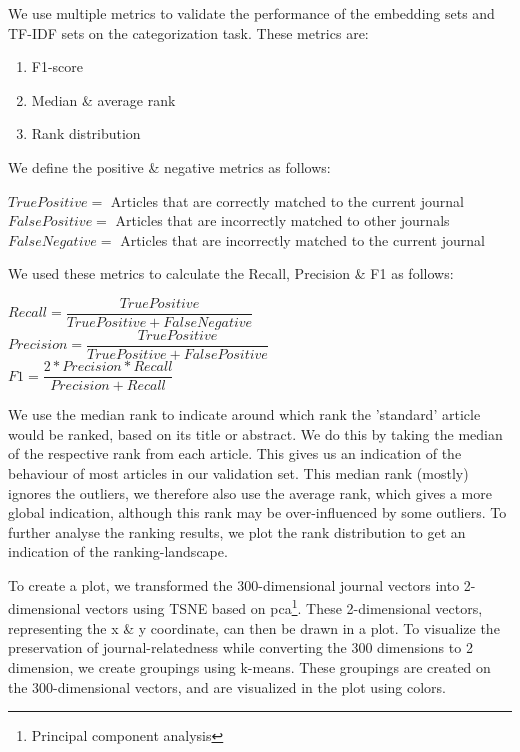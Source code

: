 \documentclass[../../Thesis.tex]{subfiles}
\begin{document}
We use multiple metrics to validate the performance of the embedding sets and TF-IDF sets on the categorization task. These metrics are:
\begin{enumerate}
\item{F1-score}
\item{Median \& average rank}
\item{Rank distribution}
\end{enumerate}
We define the positive \& negative metrics as follows:\\
\begin{jumpin}
$True Positive = $ Articles that are correctly matched to the current journal\\
$False Positive = $ Articles that are incorrectly matched to other journals\\
$False Negative = $ Articles that are incorrectly matched to the current journal\\
\end{jumpin}
We used these metrics to calculate the Recall, Precision \& F1 as follows:\\
\begin{jumpin}
$Recall = \dfrac{True Positive}{True Positive + False Negative}$\vspace{0.1in}\\
$Precision = \dfrac{True Positive}{True Positive + False Positive}$\vspace{0.1in}\\
$F1 = \dfrac{2 * Precision * Recall}{Precision + Recall}$
\end{jumpin}
We use the median rank to indicate around which rank the 'standard' article would be ranked, based on its title or abstract. We do this by taking the median of the respective rank from each article. This gives us an indication of the behaviour of most articles in our validation set. This median rank (mostly) ignores the outliers, we therefore also use the average rank, which gives a more global indication, although this rank may be over-influenced by some outliers.
To further analyse the ranking results, we plot the rank distribution to get an indication of the ranking-landscape.

To create a plot, we transformed the 300-dimensional journal vectors into 2-dimensional vectors using TSNE based on pca\footnote{Principal component analysis}. These 2-dimensional vectors, representing the x \& y coordinate, can then be drawn in a plot. To visualize the preservation of journal-relatedness while converting the 300 dimensions to 2 dimension, we create groupings using k-means. These groupings are created on the 300-dimensional vectors, and are visualized in the plot using colors.
\end{document}
